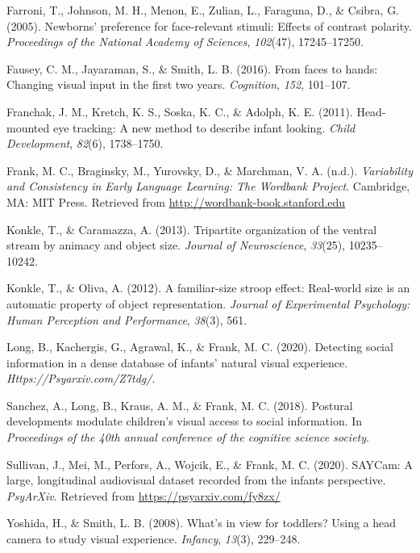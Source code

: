 \documentclass[10pt, letterpaper]{article}
\begin{document}
\leavevmode\hypertarget{ref-farroni2005newborns}{}%
Farroni, T., Johnson, M. H., Menon, E., Zulian, L., Faraguna, D., \&
Csibra, G. (2005). Newborns' preference for face-relevant stimuli:
Effects of contrast polarity. \emph{Proceedings of the National Academy
of Sciences}, \emph{102}(47), 17245--17250.

\leavevmode\hypertarget{ref-fausey2016}{}%
Fausey, C. M., Jayaraman, S., \& Smith, L. B. (2016). From faces to
hands: Changing visual input in the first two years. \emph{Cognition},
\emph{152}, 101--107.

\leavevmode\hypertarget{ref-franchak2011}{}%
Franchak, J. M., Kretch, K. S., Soska, K. C., \& Adolph, K. E. (2011).
Head-mounted eye tracking: A new method to describe infant looking.
\emph{Child Development}, \emph{82}(6), 1738--1750.

\leavevmode\hypertarget{ref-frank2020}{}%
Frank, M. C., Braginsky, M., Yurovsky, D., \& Marchman, V. A. (n.d.).
\emph{Variability and Consistency in Early Language Learning: The
Wordbank Project}. Cambridge, MA: MIT Press. Retrieved from
\url{http://wordbank-book.stanford.edu}

\leavevmode\hypertarget{ref-konkle2013tripartite}{}%
Konkle, T., \& Caramazza, A. (2013). Tripartite organization of the
ventral stream by animacy and object size. \emph{Journal of
Neuroscience}, \emph{33}(25), 10235--10242.

\leavevmode\hypertarget{ref-konkle2012familiar}{}%
Konkle, T., \& Oliva, A. (2012). A familiar-size stroop effect:
Real-world size is an automatic property of object representation.
\emph{Journal of Experimental Psychology: Human Perception and
Performance}, \emph{38}(3), 561.

\leavevmode\hypertarget{ref-long2020}{}%
Long, B., Kachergis, G., Agrawal, K., \& Frank, M. C. (2020). Detecting
social information in a dense database of infants' natural visual
experience. \emph{Https://Psyarxiv.com/Z7tdg/}.

\leavevmode\hypertarget{ref-sanchez2018postural}{}%
Sanchez, A., Long, B., Kraus, A. M., \& Frank, M. C. (2018). Postural
developments modulate children's visual access to social information. In
\emph{Proceedings of the 40th annual conference of the cognitive science
society}.

\leavevmode\hypertarget{ref-SAYcam}{}%
Sullivan, J., Mei, M., Perfors, A., Wojcik, E., \& Frank, M. C. (2020).
SAYCam: A large, longitudinal audiovisual dataset recorded from the
infants perspective. \emph{PsyArXiv}. Retrieved from
\url{https://psyarxiv.com/fy8zx/}

\leavevmode\hypertarget{ref-yoshida2008}{}%
Yoshida, H., \& Smith, L. B. (2008). What's in view for toddlers? Using
a head camera to study visual experience. \emph{Infancy}, \emph{13}(3),
229--248.


\end{document}
